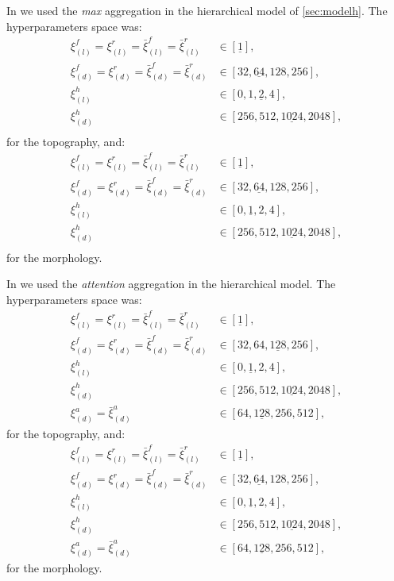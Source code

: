 In \maxh{} we used the \emph{max} aggregation in the hierarchical
model of \cref{sec:modelh}. The hyperparameters space was:
\begin{align*}
  \xi_{(l)}^f=\xi_{(l)}^r=\bar{\xi}^f_{(l)}=\bar{\xi}^r_{(l)}&\in[\underline{1}],\\
  \xi_{(d)}^f=\xi_{(d)}^r=\bar{\xi}^f_{(d)}=\bar{\xi}^r_{(d)}&\in[32,\underline{64},128,256],\\
  \xi_{(l)}^h&\in[0,1,\underline{2},4],\\
  \xi_{(d)}^h&\in[256,512,\underline{1024},2048],\\
\end{align*}
for the topography, and:
\begin{align*}
  \xi_{(l)}^f=\xi_{(l)}^r=\bar{\xi}^f_{(l)}=\bar{\xi}^r_{(l)}&\in[\underline{1}],\\
  \xi_{(d)}^f=\xi_{(d)}^r=\bar{\xi}^f_{(d)}=\bar{\xi}^r_{(d)}&\in[32,\underline{64},128,256],\\
  \xi_{(l)}^h&\in[0,\underline{1},2,4],\\
  \xi_{(d)}^h&\in[256,512,\underline{1024},2048],\\
\end{align*}
for the morphology.

In \softmaxh{} we used the \emph{attention} aggregation in the
hierarchical model. The hyperparameters space was:
\begin{align*}
  \xi_{(l)}^f=\xi_{(l)}^r=\bar{\xi}^f_{(l)}=\bar{\xi}^r_{(l)}&\in[\underline{1}],\\
  \xi_{(d)}^f=\xi_{(d)}^r=\bar{\xi}^f_{(d)}=\bar{\xi}^r_{(d)}&\in[32,64,\underline{128},256],\\
  \xi_{(l)}^h&\in[0,\underline{1},2,4],\\
  \xi_{(d)}^h&\in[256,512,\underline{1024},2048],\\
  \xi_{(d)}^a=\bar{\xi}^a_{(d)}&\in[64,\underline{128},256,512],
\end{align*}
for the topography, and:
\begin{align*}
  \xi_{(l)}^f=\xi_{(l)}^r=\bar{\xi}^f_{(l)}=\bar{\xi}^r_{(l)}&\in[\underline{1}],\\
  \xi_{(d)}^f=\xi_{(d)}^r=\bar{\xi}^f_{(d)}=\bar{\xi}^r_{(d)}&\in[32,\underline{64},128,256],\\
  \xi_{(l)}^h&\in[0,\underline{1},2,4],\\
  \xi_{(d)}^h&\in[256,512,\underline{1024},2048],\\
  \xi_{(d)}^a=\bar{\xi}^a_{(d)}&\in[64,\underline{128},256,512],
\end{align*}
for the morphology.

